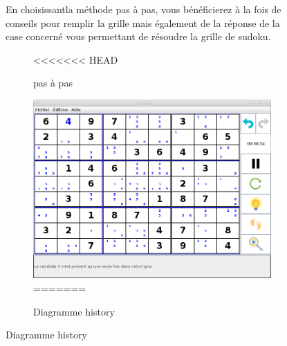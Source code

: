 \begin{figure}[ht]
\newpage
En choisissantla méthode pas à pas, vous bénéficierez à la fois de conseils
pour remplir la grille mais également de la réponse de la case concerné 
vous permettant de résoudre la grille de sudoku. 
\begin{figure}[ht]
<<<<<<< HEAD
  \caption{\label{annexe14} pas à pas}
  \includegraphics [width=130mm]{images/pas.png} \\[0.5cm]
=======
  \caption{\label{annexe17} Diagramme history}

\end{figure}
\end{figure}
